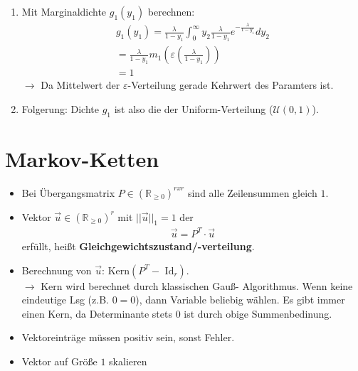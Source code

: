 \documentclass{article}
\begin{document}
\begin{enumerate}
	\item Mit Marginaldichte $g_1(y_1)$ berechnen:\\
		\begin{align}
			g_1(y_1) = \frac{\lambda}{1 - y_1} \int^\infty_0 y_2\frac{\lambda}{1 - y_1}
			e^{-\frac{\lambda}{1 - y_1}} dy_2\\
			= \frac{\lambda}{1 - y_1} m_1 (\varepsilon(\frac{\lambda}{1 - y_1}))\\
			= 1
		\end{align}
		$\longrightarrow$ Da Mittelwert der $\varepsilon$-Verteilung gerade Kehrwert des
		Paramters ist.
	\item Folgerung: Dichte $g_1$ ist also die der Uniform-Verteilung ($\mathcal{U}(0,1)$).
\end{enumerate}

\section{Markov-Ketten}
\begin{itemize}
	\item Bei Übergangsmatrix $P \in (\mathbb{R}_{\geq 0})^{r x r}$ sind
		alle Zeilensummen gleich $1$.
	\item Vektor $\vec{u} \in (\mathbb{R}_{\geq 0})^{r}$ mit $||\vec{u}||_1 = 1$
		der
		\begin{align}
			\vec{u} = P^T \cdot \vec{u}
		\end{align}
		erfüllt, heißt \textbf{Gleichgewichtszustand/-verteilung}.
	\item Berechnung von $\vec{u}$: $\text{Kern}(P^T - \text{ Id}_r)$.\\$\rightarrow$
		Kern wird berechnet durch klassischen Gauß- Algorithmus. Wenn keine
		eindeutige Lsg (z.B. $0 = 0$), dann Variable beliebig wählen. Es gibt
		immer einen Kern, da Determinante stets $0$ ist durch obige Summenbedinung.
	\item Vektoreinträge müssen positiv sein, sonst Fehler.
	\item Vektor auf Größe $1$ skalieren
\end{itemize}
\end{document}
